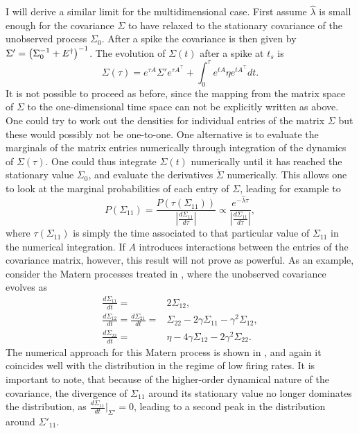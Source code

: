I will derive a similar limit for the multidimensional case. First assume $\hat{\lambda}$ is small enough for the covariance $\Sigma$ to have relaxed to the stationary covariance of the unobserved process $\Sigma_0$. After a spike the covariance is then given by $\Sigma' = \left(\Sigma_0^{-1}+E^\dagger\right)^{-1}$. The evolution of $\Sigma(t)$ after a spike at $t_s$ is
\[
\Sigma(\tau) = e^{\tau A} \Sigma' e^{\tau A^\top} + \int_0^\tau e^{t A}\eta e^{t A^\top} dt.
\]
It is not possible to proceed as before, since the mapping from the matrix space of $\Sigma$ to the one-dimensional time space can not be explicitly written as above.
One could try to work out the densities for individual entries of the matrix $\Sigma$ but these would 
possibly not be one-to-one. One alternative is to evaluate the marginals of the matrix entries numerically through integration of the dynamics of $\Sigma(\tau)$.
One could thus integrate $\Sigma(t)$ numerically until it has reached the stationary value $\Sigma_0$, and evaluate the derivatives $\dot{\Sigma}$ numerically. This allows one to
look at the marginal probabilities of each entry of $\Sigma$, leading for example to
\[
P(\Sigma_{11}) = \frac{P(\tau(\Sigma_{11}))}{\left|\frac{d \Sigma_{11}}{d\tau}\right|} \propto \frac{e^{-\hat{\lambda} \tau}}{\left|\frac{d \Sigma_{11}}{d\tau}\right|},
\]
where $\tau(\Sigma_{11})$ is simply the time associated to that particular value of $\Sigma_{11}$ in the numerical integration.
If $A$ introduces interactions between the entries of the covariance matrix, however, this result will not prove as powerful. As an example, consider the Matern processes treated in , 
where the unobserved covariance evolves as
\begin{eqnarray*}
\frac{d\Sigma_{11}}{dt} = &2 \Sigma_{12},\\
\frac{d\Sigma_{12}}{dt} = \frac{d\Sigma_{21}}{dt} =& \Sigma_{22} -2 \gamma \Sigma_{11} -\gamma^2 \Sigma_{12},\\
\frac{d\Sigma_{22}}{dt} = & \eta -4 \gamma \Sigma_{12} -2\gamma^2\Sigma_{22}.
\end{eqnarray*}
The numerical approach for this Matern process is shown in , and again it coincides well with the distribution in the regime of low firing rates. It is important
to note, that because of the higher-order dynamical nature of the covariance, the divergence of $\Sigma_{11}$ around its stationary value no longer dominates the distribution, as
$\frac{d\Sigma_{11}}{dt}|_{\Sigma'} = 0$, leading to a second peak in the distribution around $\Sigma'_{11}$. 

